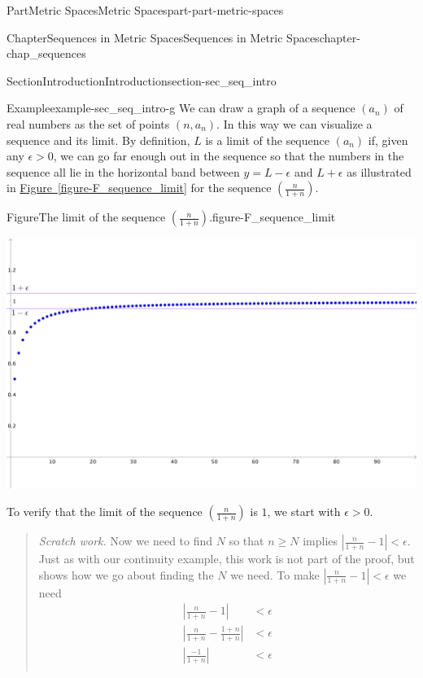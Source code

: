 \documentclass[oneside,10pt,]{book}
\newcommand{\xreffont}{\relax}
\numberwithin{equation}{chapter}
\newcommand{\lt}{<}
\newcommand{\gt}{>}
\newcommand{\amp}{&}
\begin{document}
\begin{partptx}{Part}{Metric Spaces}{}{Metric Spaces}{}{}{part-part-metric-spaces}
\begin{chapterptx}{Chapter}{Sequences in Metric Spaces}{}{Sequences in Metric Spaces}{}{}{chapter-chap_sequences}
\begin{sectionptx}{Section}{Introduction}{}{Introduction}{}{}{section-sec_seq_intro}
\begin{example}{Example}{}{example-sec_seq_intro-g}%
We can draw a graph of a sequence \((a_n)\) of real numbers as the set of points \((n,a_n)\). In this way we can visualize a sequence and its limit. By definition, \(L\) is a limit of the sequence \((a_n)\) if, given any \(\epsilon \gt 0\), we can go far enough out in the sequence so that the numbers in the sequence all lie in the horizontal band between \(y = L -\epsilon\) and \(L+ \epsilon\) as illustrated in \hyperref[figure-F_sequence_limit]{Figure~{\xreffont\ref{figure-F_sequence_limit}}} for the sequence \(\left(\frac{n}{1+n}\right)\).%
\begin{figureptx}{Figure}{The limit of the sequence \(\left(\frac{n}{1+n}\right)\).}{figure-F_sequence_limit}{}%
\begin{image}{0.05}{0.9}{0.05}{}%
\includegraphics[width=\linewidth]{external/Sequence_limit.pdf}
\end{image}%
\tcblower
\end{figureptx}%
To verify that the limit of the sequence \(\left(\frac{n}{1+n}\right)\) is \(1\), we start with \(\epsilon \gt 0\).%
\begin{quote}%
\emph{Scratch work.} Now we need to find \(N\) so that \(n \geq N\) implies \(\left| \frac{n}{1+n} - 1 \right| \lt  \epsilon\). Just as with our continuity example, this work is not part of the proof, but shows how we go about finding the \(N\) we need. To make \(\left| \frac{n}{1+n} - 1 \right| \lt  \epsilon\) we need%
\begin{align*}
\left| \frac{n}{1+n} - 1 \right| \amp \lt  \epsilon\\
\left| \frac{n}{1+n} - \frac{1+n}{1+n}  \right| \amp \lt  \epsilon\\
\left| \frac{-1}{1+n} \right| \amp \lt  \epsilon\\

\end{align*}
\end{quote}
\end{example}
\end{sectionptx}
\end{chapterptx}
\end{partptx}
\end{document}
